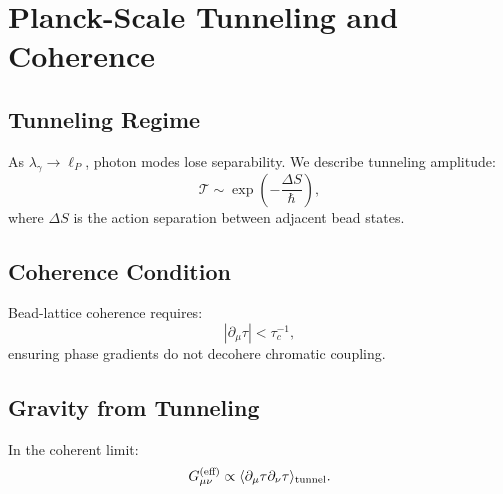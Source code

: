 \chapter{Planck-Scale Tunneling and Coherence}

\section{Tunneling Regime}

As $\lambda_\gamma\to \ell_P$, photon modes lose separability.  
We describe tunneling amplitude:
\[
\mathcal{T} 
\sim 
\exp\left(-\frac{\Delta S}{\hbar}\right),
\]
where $\Delta S$ is the action separation between adjacent bead states.

\section{Coherence Condition}

Bead-lattice coherence requires:
\[
|\partial_\mu\tau| < \tau_c^{-1},
\]
ensuring phase gradients do not decohere chromatic coupling.

\section{Gravity from Tunneling}

In the coherent limit:
\[
G_{\mu\nu}^{(\text{eff})}
\propto
\langle \partial_\mu \tau \partial_\nu\tau \rangle_{\rm tunnel}.
\]


